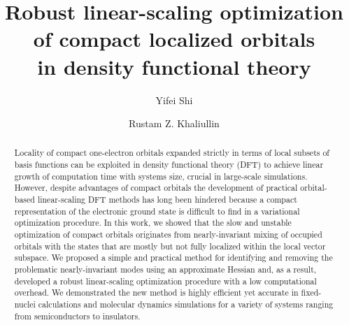 \documentclass[10pt,amsmath,twocolumn,aps,prl,superscriptaddress,floatfix]{revtex4-1}
\begin{document}
\newcommand{\Ang}{\ensuremath{\mathring{\text{A}}}}
\newcommand{\ket}[1]{\ensuremath{\vert #1 \rangle}}
\newcommand{\bra}[1]{\ensuremath{\langle #1 \vert}}
\newcommand{\braket}[2]{\ensuremath{\langle #1 \vert #2 \rangle}} %
\newcommand{\ketbra}[2]{\ensuremath{\vert #1 \rangle \langle #2 \vert}} %
\newcommand{\op}[1]{\ensuremath{\hat{#1}}} %
\newcommand{\trace}{{\rm Tr}}
\newcommand{\bea}{\begin{eqnarray}}
\newcommand{\eea}{\end{eqnarray}}
\newcommand{\br}{\ensuremath{\mathbf{r}}}
\def\nn{\nonumber\\}



\title{Robust linear-scaling optimization of compact localized orbitals\\
in density functional theory}

\author{Yifei Shi}
\author{Rustam Z. Khaliullin}


\begin{abstract} 
Locality of compact one-electron orbitals expanded strictly in terms of local subsets of basis functions can be exploited in density functional theory (DFT) to achieve linear growth of computation time with systems size, crucial in large-scale simulations. However, despite advantages of compact orbitals the development of practical orbital-based linear-scaling DFT methods has long been hindered because a compact representation of the electronic ground state is difficult to find in a variational optimization procedure. In this work, we showed that the slow and unstable optimization of compact orbitals originates from nearly-invariant mixing of occupied orbitals with the states that are mostly but not fully localized within the local vector subspace. We proposed a simple and practical method for identifying and removing the problematic nearly-invariant modes using an approximate Hessian and, as a result, developed a robust linear-scaling optimization procedure with a low computational overhead. We demonstrated the new method is highly efficient yet accurate in fixed-nuclei calculations and molecular dynamics simulations for a variety of systems ranging from semiconductors to insulators.  
\end{abstract}
\maketitle
\end{document}
